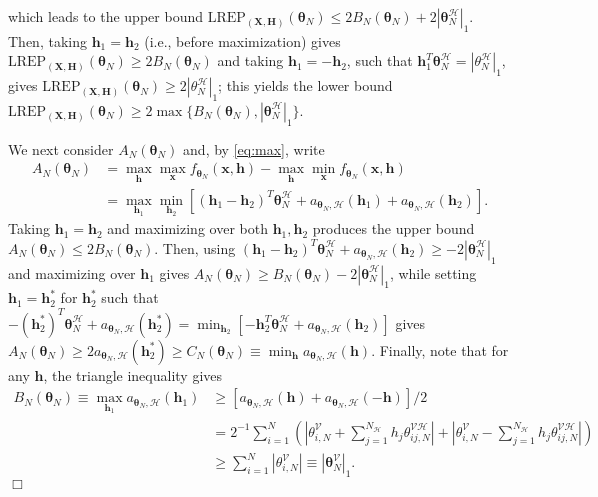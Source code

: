 \documentclass[numbib]{imamat}
\theoremstyle{theorem}
\theoremstyle{lemma}
\theoremstyle{example}
\theoremstyle{corollary}
\theoremstyle{definition}
\theoremstyle{remark}
\theoremstyle{approximation}
\theoremstyle{scheme}
\newcommand{\REP}{\mathrm{LREP}}
\newcommand{\elt}{A_{N}(\boldsymbol \theta_N) }
\newcommand{\Gam}{B_{N}(\boldsymbol \theta_N) }
\newcommand{\Gamc}{C_{N}(\boldsymbol \theta_N) }
\begin{document}
which leads to the upper bound \(\REP_{(\boldsymbol X, \boldsymbol H)}(\boldsymbol \theta_N) \leq 2 \Gam + 2 |\boldsymbol \theta_N^{\mathcal{H}} |_1\). Then, taking \(\boldsymbol h_1=\boldsymbol h_2\) (i.e., before maximization) gives \(\REP_{(\boldsymbol X, \boldsymbol H)}(\boldsymbol \theta_N) \geq 2\Gam\) and taking \(\boldsymbol h_1=-\boldsymbol h_2\), such that \(\boldsymbol h_1^T \boldsymbol \theta_N^{\mathcal{H}} = |\theta_N^{\mathcal{H}}|_1\), gives \(\REP_{(\boldsymbol X, \boldsymbol H)}(\boldsymbol \theta_N) \geq 2|\theta_N^{\mathcal{H}}|_1\); this yields the lower bound \(\REP_{(\boldsymbol X, \boldsymbol H)}(\boldsymbol \theta_N)\geq 2\max\{\Gam, |\boldsymbol \theta_N^{\mathcal{H}} |_1\}\).

We next consider \(\elt\) and, by \eqref{eq:max}, write
\begin{align*}
\elt &=  \max_{\boldsymbol h}\max_{\boldsymbol x}f_{\boldsymbol \theta_N} (\boldsymbol x , \boldsymbol h) -  \max_{\boldsymbol h}\min_{\boldsymbol x}f_{\boldsymbol \theta_N} (\boldsymbol x , \boldsymbol h)\\
&= \max_{\boldsymbol h_1} \min_{\boldsymbol h_2 }\left[ (\boldsymbol h_1 - \boldsymbol h_2)^T \boldsymbol \theta_N^{\mathcal{H}} + a_{\boldsymbol \theta_N, \mathcal{H}} (\boldsymbol h_1)  + a_{\boldsymbol \theta_N, \mathcal{H}} (\boldsymbol h_2)\right].
\end{align*}
Taking \(\boldsymbol h_1=\boldsymbol h_2\) and maximizing over both \(\boldsymbol h_1,\boldsymbol h_2\) produces the upper bound \(\elt \leq 2\Gam\). Then, using \((\boldsymbol h_1 - \boldsymbol h_2)^T \boldsymbol \theta_N^{\mathcal{H}} + a_{\boldsymbol \theta_N, \mathcal{H}} (\boldsymbol h_2) \geq - 2|\boldsymbol \theta_N^{\mathcal{H}} |_1\) and maximizing over \(\boldsymbol h_1\) gives \(\elt \geq \Gam- 2|\boldsymbol \theta_N^{\mathcal{H}} |_1\), while setting \(\boldsymbol h_1=\boldsymbol h_2^*\) for \(\boldsymbol h_2^*\) such that \(-(\boldsymbol h_2^*) ^T \boldsymbol \theta_N^{\mathcal{H}} + a_{\boldsymbol \theta_N, \mathcal{H}} (\boldsymbol h_2^*) = \min_{\boldsymbol h_2} [-\boldsymbol h_2^T \boldsymbol \theta_N^{\mathcal{H}} + a_{\boldsymbol \theta_N, \mathcal{H}} (\boldsymbol h_2)]\) gives \(\elt \geq 2 a_{\boldsymbol \theta_N, \mathcal{H}} (\boldsymbol h_2^*) \geq \Gamc \equiv \min_{\boldsymbol h} a_{\boldsymbol \theta_N, \mathcal{H}} (\boldsymbol h)\). Finally, note that for any \(\boldsymbol h\), the triangle inequality gives
\begin{align*}
\Gam  \equiv \max_{\boldsymbol h_1}  a_{\boldsymbol \theta_N, \mathcal{H}} (\boldsymbol h_1) &\geq
[a_{\boldsymbol \theta_N, \mathcal{H}} (\boldsymbol h)  + a_{\boldsymbol \theta_N, \mathcal{H}} (-\boldsymbol h)]/2 \\
&=
2^{-1}\sum_{i=1}^{N } \left(\left| \theta_{i,N}^{\mathcal{V}}   + \sum_{j=1}^{N_{\mathcal{H}}} h_j \theta_{ij,N}^{\mathcal{VH}} \right|
+ \left| \theta_{i,N}^{\mathcal{V}}   - \sum_{j=1}^{N_{\mathcal{H}}} h_j \theta_{ij,N}^{\mathcal{VH}} \right|\right)\\
& \geq \sum_{i=1}^{N }  \left| \theta_{i,N}^{\mathcal{V}} \right| \equiv |\boldsymbol \theta_{N}^{\mathcal{V}}|_1.
\end{align*}
\hfill \(\Box\)
\end{document}
